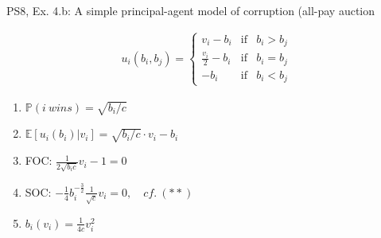 \begin{frame}{PS8, Ex. 4.b: A simple principal-agent model of corruption (all-pay auction}
\begin{multicols}{2}
\begin{align*}
        u_i(b_i,b_j)=\left\{\begin{array}{lcl}
          v_i-b_i           & \text{if} & b_i>b_j \\
          \frac{v_i}{2}-b_i & \text{if} & b_i=b_j \\
          -b_i              & \text{if} & b_i<b_j
        \end{array}\right.
      \end{align*} \vspace{-16pt}
      \begin{enumerate}
        \item $\mathbb{P}(i\ wins)=\sqrt{b_i/c}$
        \item $\mathbb{E}[u_i(b_i)|v_i]=\sqrt{b_i/c}\cdot v_i-b_i$
        \item FOC: $\frac{1}{2\sqrt{b_ic}}v_i-1=0$
        \item[] SOC: $-\frac{1}{4}b_i^{-\frac{3}{2}}\frac{1}{\sqrt{c}}v_i=0,\quad cf.\ (**)$
        \item $b_i(v_i)=\frac{1}{4c}v_i^2$
      \end{enumerate}
      \vfill\null
    \end{multicols}
\end{frame}
